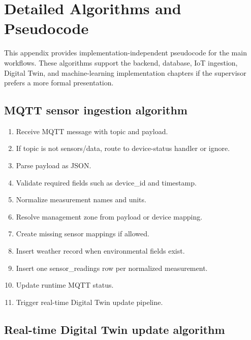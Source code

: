 \chapter{Detailed Algorithms and Pseudocode}

This appendix provides implementation-independent pseudocode for the main workflows. These algorithms support the backend, database, IoT ingestion, Digital Twin, and machine-learning implementation chapters if the supervisor prefers a more formal presentation.

\section{MQTT sensor ingestion algorithm}

\begin{enumerate}

\item Receive MQTT message with topic and payload.

\item If topic is not sensors/data, route to device-status handler or ignore.

\item Parse payload as JSON.

\item Validate required fields such as device\_id and timestamp.

\item Normalize measurement names and units.

\item Resolve management zone from payload or device mapping.

\item Create missing sensor mappings if allowed.

\item Insert weather record when environmental fields exist.

\item Insert one sensor\_readings row per normalized measurement.

\item Update runtime MQTT status.

\item Trigger real-time Digital Twin update pipeline.

\end{enumerate}

\section{Real-time Digital Twin update algorithm}

